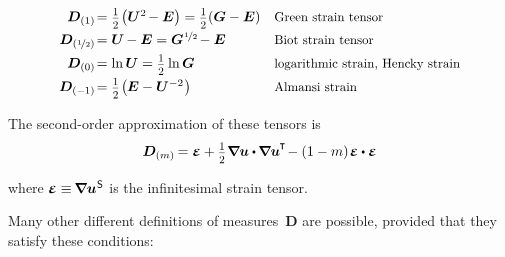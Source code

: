 \nopagebreak\begin{equation*}
\begin{array}{r@{\hspace{0.1em}}ll}
\bm{D}_{(1)} & = \smalldisplaystyleonehalf \hspace{-0.25ex} \left( \bm{U}^{2} \hspace{-0.25ex} - \bm{E} \right) = \smalldisplaystyleonehalf (\bm{G} - \bm{E}) & \text{\scalebox{0.92}[0.92]{Green strain tensor}}
\\[.4em]
\bm{D}_{(\nicefrac{1}{2})} & = \bm{U} \hspace{-0.15ex} - \bm{E} = \bm{G}^{\hspace{.1ex}\nicefrac{1}{2}} \hspace{-0.25ex} - \bm{E} & \text{\scalebox{0.92}[0.92]{Biot strain tensor}}
\\[.4em]
\bm{D}_{(0)} & = \ln \bm{U} = \smalldisplaystyleonehalf \ln \bm{G} & \text{\scalebox{0.92}[0.92]{logarithmic strain, Hencky strain}}
\\[.4em]
\bm{D}_{(-\hspace{-0.1ex}1)} & = \smalldisplaystyleonehalf \hspace{-0.25ex} \left( \hspace{-0.1ex} \bm{E} - \bm{U}^{-2} \hspace{.1ex} \right) & \text{\scalebox{0.92}[0.92]{Almansi strain}}
\end{array}
\end{equation*}

The second\hbox{-}order approximation of these tensors is
\[ \bm{D}_{(m)} \hspace{-0.2ex} =
\mathboldepsilon
+ \smalldisplaystyleonehalf \hspace{.1ex} \boldnabla\bm{u} \dotp \hspace{-0.1ex} \boldnabla\bm{u}^{\hspace{-0.1ex}\T} \hspace{-0.3ex}
- (1 - m) \hspace{0.2ex} \mathboldepsilon \dotp \mathboldepsilon \]

\vspace{-0.25em} \noindent where ${\mathboldepsilon \equiv \hspace{-0.2ex} \boldnabla {\bm{u}}^{\hspace{.1ex}\mathsf{S}}}$ is the infinitesimal strain tensor.

Many other different definitions of measures~$\bm{D}$ are possible, provided that they satisfy these conditions:

